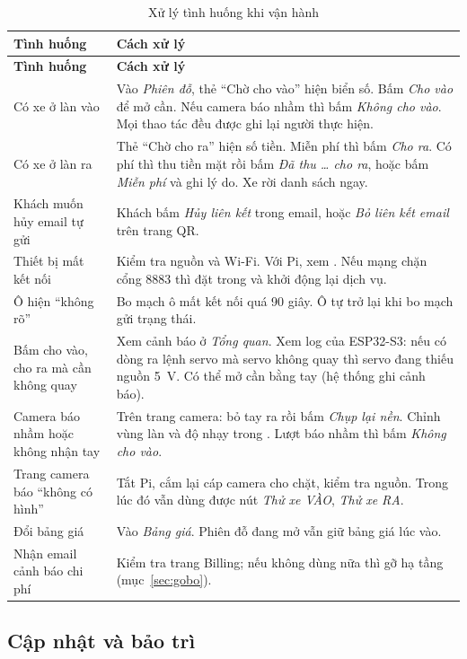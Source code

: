 \begin{longtable}{@{}P{4.6cm}P{9.5cm}@{}}
\caption{Xử lý tình huống khi vận hành}\label{tab:runbook}\\
\toprule
\textbf{Tình huống} & \textbf{Cách xử lý} \\ \midrule
\endfirsthead
\toprule
\textbf{Tình huống} & \textbf{Cách xử lý} \\ \midrule
\endhead
Có xe ở làn vào & Vào \emph{Phiên đỗ}, thẻ ``Chờ cho vào'' hiện biển số. Bấm \emph{Cho vào} để mở cần. Nếu camera báo nhầm thì bấm \emph{Không cho vào}. Mọi thao tác đều được ghi lại người thực hiện. \\
Có xe ở làn ra & Thẻ ``Chờ cho ra'' hiện số tiền. Miễn phí thì bấm \emph{Cho ra}. Có phí thì thu tiền mặt rồi bấm \emph{Đã thu \ldots{} cho ra}, hoặc bấm \emph{Miễn phí} và ghi lý do. Xe rời danh sách ngay. \\
Khách muốn hủy email tự gửi & Khách bấm \emph{Hủy liên kết} trong email, hoặc \emph{Bỏ liên kết email} trên trang QR. \\
Thiết bị mất kết nối & Kiểm tra nguồn và Wi-Fi. Với Pi, xem . Nếu mạng chặn cổng 8883 thì đặt  trong  và khởi động lại dịch vụ. \\
Ô hiện ``không rõ'' & Bo mạch ô mất kết nối quá 90 giây. Ô tự trở lại khi bo mạch gửi trạng thái. \\
Bấm cho vào, cho ra mà cần không quay & Xem cảnh báo ở \emph{Tổng quan}. Xem log của ESP32-S3: nếu có dòng ra lệnh servo mà servo không quay thì servo đang thiếu nguồn 5~V. Có thể mở cần bằng tay (hệ thống ghi cảnh báo). \\
Camera báo nhầm hoặc không nhận tay & Trên trang camera: bỏ tay ra rồi bấm \emph{Chụp lại nền}. Chỉnh vùng làn và độ nhạy trong . Lượt báo nhầm thì bấm \emph{Không cho vào}. \\
Trang camera báo ``không có hình'' & Tắt Pi, cắm lại cáp camera cho chặt, kiểm tra nguồn. Trong lúc đó vẫn dùng được nút \emph{Thử xe VÀO}, \emph{Thử xe RA}. \\
Đổi bảng giá & Vào \emph{Bảng giá}. Phiên đỗ đang mở vẫn giữ bảng giá lúc vào. \\
Nhận email cảnh báo chi phí & Kiểm tra trang Billing; nếu không dùng nữa thì gỡ hạ tầng (mục~\ref{sec:gobo}). \\
\bottomrule
\end{longtable}

\subsection{Cập nhật và bảo trì}

